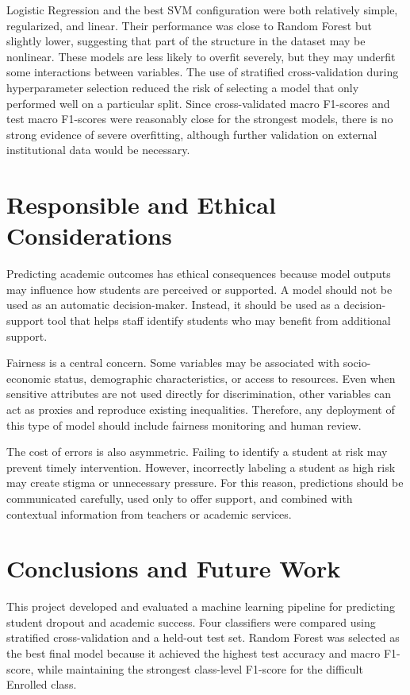 \documentclass[lettersize,journal]{IEEEtran}
\begin{document}
Logistic Regression and the best SVM configuration were both relatively simple, regularized, and linear. Their performance was close to Random Forest but slightly lower, suggesting that part of the structure in the dataset may be nonlinear. These models are less likely to overfit severely, but they may underfit some interactions between variables. The use of stratified cross-validation during hyperparameter selection reduced the risk of selecting a model that only performed well on a particular split. Since cross-validated macro F1-scores and test macro F1-scores were reasonably close for the strongest models, there is no strong evidence of severe overfitting, although further validation on external institutional data would be necessary.

\section{Responsible and Ethical Considerations}
Predicting academic outcomes has ethical consequences because model outputs may influence how students are perceived or supported. A model should not be used as an automatic decision-maker. Instead, it should be used as a decision-support tool that helps staff identify students who may benefit from additional support.

Fairness is a central concern. Some variables may be associated with socio-economic status, demographic characteristics, or access to resources. Even when sensitive attributes are not used directly for discrimination, other variables can act as proxies and reproduce existing inequalities. Therefore, any deployment of this type of model should include fairness monitoring and human review.

The cost of errors is also asymmetric. Failing to identify a student at risk may prevent timely intervention. However, incorrectly labeling a student as high risk may create stigma or unnecessary pressure. For this reason, predictions should be communicated carefully, used only to offer support, and combined with contextual information from teachers or academic services.

\section{Conclusions and Future Work}
This project developed and evaluated a machine learning pipeline for predicting student dropout and academic success. Four classifiers were compared using stratified cross-validation and a held-out test set. Random Forest was selected as the best final model because it achieved the highest test accuracy and macro F1-score, while maintaining the strongest class-level F1-score for the difficult Enrolled class.
\end{document}
